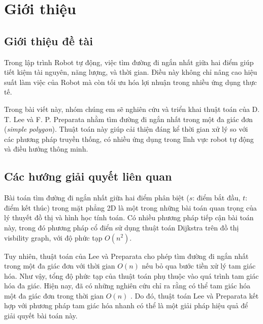 \section{Giới thiệu}
\subsection{Giới thiệu đề tài}
Trong lập trình Robot tự động, việc tìm đường đi ngắn nhất giữa hai điểm giúp tiết kiệm tài nguyên, năng lượng, và thời gian. Điều này không chỉ nâng cao hiệu suất làm việc của Robot mà còn tối ưu hóa lợi nhuận trong nhiều ứng dụng thực tế. 

Trong bài viết này, nhóm chúng em sẽ nghiên cứu và triển khai thuật toán của D. T. Lee và F. P. Preparata nhằm tìm đường đi ngắn nhất trong một đa giác đơn (\textit{simple polygon}). Thuật toán này giúp cải thiện đáng kể thời gian xử lý so với các phương pháp truyền thống, có nhiều ứng dụng trong lĩnh vực robot tự động và điều hướng thông minh.

\subsection{Các hướng giải quyết liên quan}

Bài toán tìm đường đi ngắn nhất giữa hai điểm phân biệt ($s$: điểm bắt đầu, $t$: điểm kết thúc) trong mặt phẳng 2D là một trong những bài toán quan trọng của lý thuyết đồ thị và hình học tính toán. Có nhiều phương pháp tiếp cận bài toán này, trong đó phương pháp cổ điển sử dụng thuật toán Dijkstra trên đồ thị visbility graph, với độ phức tạp $O(n^2)$.

Tuy nhiên, thuật toán của Lee và Preparata cho phép tìm đường đi ngắn nhất trong một đa giác đơn với thời gian $O(n)$ nếu bỏ qua bước tiền xử lý tam giác hóa. Như vậy, tổng độ phức tạp của thuật toán phụ thuộc vào quá trình tam giác hóa đa giác. Hiện nay, đã có những nghiên cứu chỉ ra rằng có thể tam giác hóa một đa giác đơn trong thời gian $O(n)$ \cite{Triangulate_linear}. Do đó, thuật toán Lee và Preparata kết hợp với phương pháp tam giác hóa nhanh có thể là một giải pháp hiệu quả để giải quyết bài toán này.